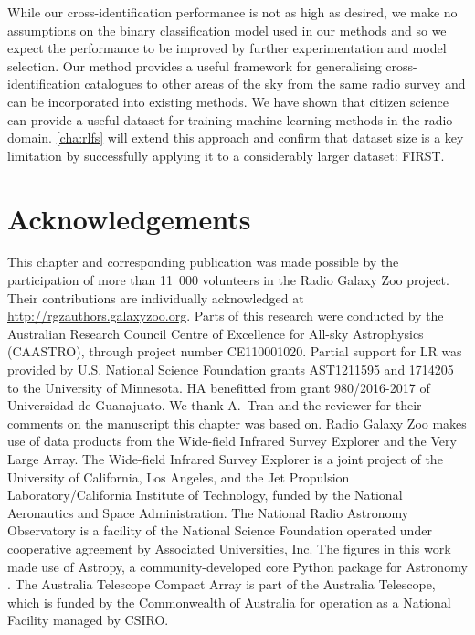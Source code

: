   While our cross-identification performance is not as high as desired, we
  make no assumptions on the binary classification model used in our methods
  and so we expect the performance to be improved by further experimentation
  and model selection. Our method provides a useful framework for generalising
  cross-identification catalogues to other areas of the sky from the same
  radio survey and can be incorporated into existing methods. {We have
  shown that citizen science can provide a useful dataset for training machine
  learning methods in the radio domain.} \autoref{cha:rlfs} will extend this
  approach and confirm that dataset size is a key limitation by successfully applying it to a considerably larger dataset: FIRST.

\section{Acknowledgements}

  This chapter and corresponding publication was made possible by the participation of more than
  11~000 volunteers in the Radio Galaxy Zoo project. Their contributions are
  individually acknowledged at \url{http://rgzauthors.galaxyzoo.org}. Parts of
  this research were conducted by the Australian Research Council Centre of
  Excellence for All-sky Astrophysics (CAASTRO), through project number
  CE110001020. Partial support for LR was provided by U.S. National Science
  Foundation grants AST1211595 and 1714205 to the University of Minnesota. HA
  benefitted from grant 980/2016-2017 of Universidad de Guanajuato. We thank
  A.~Tran and the reviewer for their comments on the manuscript this chapter was based on.
  Radio Galaxy Zoo makes use of
  data products from the Wide-field Infrared Survey Explorer and the Very
  Large Array. The Wide-field Infrared Survey Explorer is a joint project of
  the University of California, Los Angeles, and the Jet Propulsion
  Laboratory/California Institute of Technology, funded by the National
  Aeronautics and Space Administration. The National Radio Astronomy
  Observatory is a facility of the National Science Foundation operated under
  cooperative agreement by Associated Universities, Inc. The figures
  in this work made use of Astropy, a community-developed core Python package
  for Astronomy \citep{astropy}. The Australia Telescope Compact Array is part
  of the Australia Telescope, which is funded by the Commonwealth of Australia
  for operation as a National Facility managed by CSIRO.



